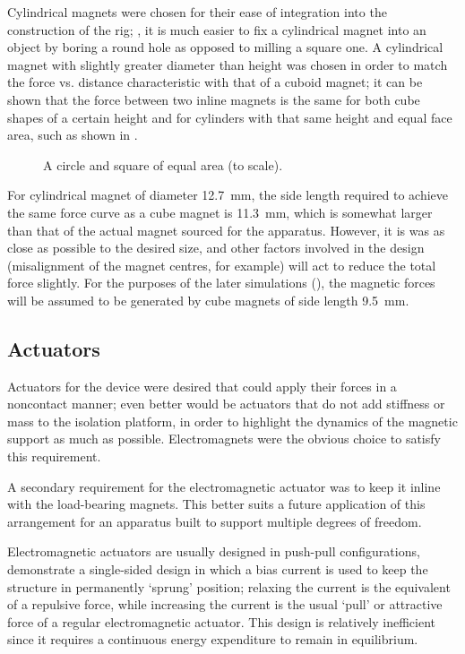Cylindrical magnets were chosen for their ease of integration into the
construction of the rig; \eg, it is much easier to fix a cylindrical magnet
into an object by boring a round hole as opposed to milling a square one. A
cylindrical magnet with slightly greater diameter than height was chosen in
order to match the force vs. distance characteristic with that of a cuboid
magnet; it can be shown that the force between two inline magnets is the same
for both cube shapes of a certain height and for cylinders with that same
height and equal face area, such as shown in .

\begin{figure}
  \caption{A circle and square of equal area (to scale).}
\end{figure}

For cylindrical magnet of diameter \SI{12.7}{mm}, the side length required to
achieve the same force curve as a cube magnet is \SI{11.3}{mm}, which is
somewhat larger than that of the actual magnet sourced for the apparatus.
However, it is was as close as possible to the desired size, and other factors
involved in the design (misalignment of the magnet centres, for example) will
act to reduce the total force slightly. For the purposes of the later
simulations (), the magnetic forces will be assumed to be
generated by cube magnets of side length \SI{9.5}{mm}.

\subsection{Actuators}

Actuators for the device were desired that could apply their forces in a
noncontact manner; even better would be actuators that do not add stiffness or
mass to the isolation platform, in order to highlight the dynamics of the
magnetic support as much as possible. Electromagnets were the obvious choice
to satisfy this requirement. 

A secondary requirement for the electromagnetic actuator was to keep it inline
with the load-bearing magnets. This better suits a future application of this
arrangement for an apparatus built to support multiple degrees of freedom.

Electromagnetic actuators are usually designed in push-pull configurations,
\textcite{nandi2009} demonstrate a single-sided design in which a bias current
is used to keep the structure in permanently `sprung' position; relaxing the
current is the equivalent of a repulsive force, while increasing the current
is the usual `pull' or attractive force of a regular electromagnetic actuator.
This design is relatively inefficient since it requires a continuous energy
expenditure to remain in equilibrium.

